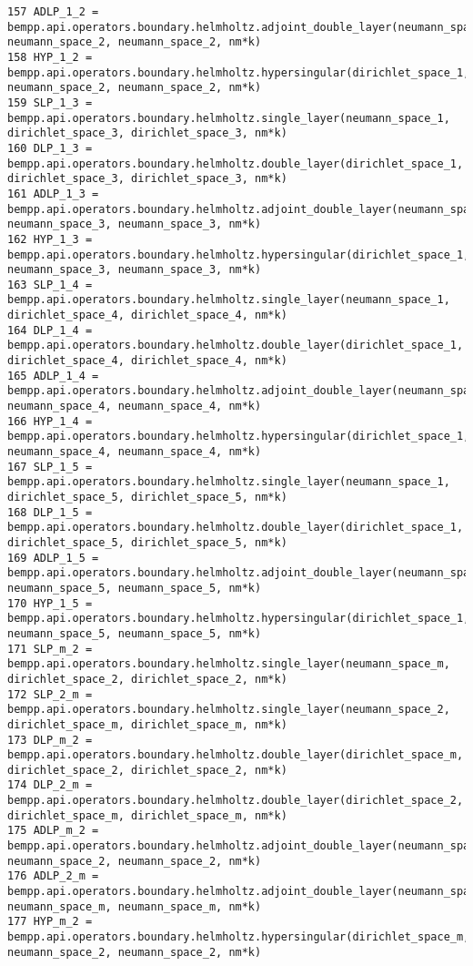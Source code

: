 \documentclass[12pt,letterpaper]{article}
\numberwithin{equation}{section}
\begin{document}
\begin{lstlisting}
157 ADLP_1_2 = bempp.api.operators.boundary.helmholtz.adjoint_double_layer(neumann_space_1, neumann_space_2, neumann_space_2, nm*k)
158 HYP_1_2 = bempp.api.operators.boundary.helmholtz.hypersingular(dirichlet_space_1, neumann_space_2, neumann_space_2, nm*k)
159 SLP_1_3 = bempp.api.operators.boundary.helmholtz.single_layer(neumann_space_1, dirichlet_space_3, dirichlet_space_3, nm*k)
160 DLP_1_3 = bempp.api.operators.boundary.helmholtz.double_layer(dirichlet_space_1, dirichlet_space_3, dirichlet_space_3, nm*k)
161 ADLP_1_3 = bempp.api.operators.boundary.helmholtz.adjoint_double_layer(neumann_space_1, neumann_space_3, neumann_space_3, nm*k)
162 HYP_1_3 = bempp.api.operators.boundary.helmholtz.hypersingular(dirichlet_space_1, neumann_space_3, neumann_space_3, nm*k)
163 SLP_1_4 = bempp.api.operators.boundary.helmholtz.single_layer(neumann_space_1, dirichlet_space_4, dirichlet_space_4, nm*k)
164 DLP_1_4 = bempp.api.operators.boundary.helmholtz.double_layer(dirichlet_space_1, dirichlet_space_4, dirichlet_space_4, nm*k)
165 ADLP_1_4 = bempp.api.operators.boundary.helmholtz.adjoint_double_layer(neumann_space_1, neumann_space_4, neumann_space_4, nm*k)
166 HYP_1_4 = bempp.api.operators.boundary.helmholtz.hypersingular(dirichlet_space_1, neumann_space_4, neumann_space_4, nm*k)
167 SLP_1_5 = bempp.api.operators.boundary.helmholtz.single_layer(neumann_space_1, dirichlet_space_5, dirichlet_space_5, nm*k)
168 DLP_1_5 = bempp.api.operators.boundary.helmholtz.double_layer(dirichlet_space_1, dirichlet_space_5, dirichlet_space_5, nm*k)
169 ADLP_1_5 = bempp.api.operators.boundary.helmholtz.adjoint_double_layer(neumann_space_1, neumann_space_5, neumann_space_5, nm*k)
170 HYP_1_5 = bempp.api.operators.boundary.helmholtz.hypersingular(dirichlet_space_1, neumann_space_5, neumann_space_5, nm*k)
171 SLP_m_2 = bempp.api.operators.boundary.helmholtz.single_layer(neumann_space_m, dirichlet_space_2, dirichlet_space_2, nm*k)
172 SLP_2_m = bempp.api.operators.boundary.helmholtz.single_layer(neumann_space_2, dirichlet_space_m, dirichlet_space_m, nm*k)
173 DLP_m_2 = bempp.api.operators.boundary.helmholtz.double_layer(dirichlet_space_m, dirichlet_space_2, dirichlet_space_2, nm*k)
174 DLP_2_m = bempp.api.operators.boundary.helmholtz.double_layer(dirichlet_space_2, dirichlet_space_m, dirichlet_space_m, nm*k)
175 ADLP_m_2 = bempp.api.operators.boundary.helmholtz.adjoint_double_layer(neumann_space_m, neumann_space_2, neumann_space_2, nm*k)
176 ADLP_2_m = bempp.api.operators.boundary.helmholtz.adjoint_double_layer(neumann_space_2, neumann_space_m, neumann_space_m, nm*k)
177 HYP_m_2 = bempp.api.operators.boundary.helmholtz.hypersingular(dirichlet_space_m, neumann_space_2, neumann_space_2, nm*k)

\end{lstlisting}
\end{document}

